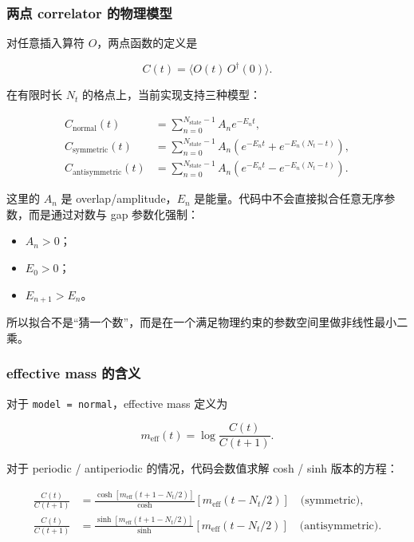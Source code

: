 \documentclass[11pt,a4paper,fontset=fandol]{ctexart}
\begin{document}
\subsubsection{两点 correlator 的物理模型}

对任意插入算符 $O$，两点函数的定义是

\begin{equation}
C(t) = \langle O(t)\, O^\dagger(0) \rangle.
\end{equation}

在有限时长 $N_t$ 的格点上，当前实现支持三种模型：

\begin{align}
C_{\mathrm{normal}}(t) &= \sum_{n=0}^{N_{\mathrm{state}}-1} A_n e^{-E_n t}, \\
C_{\mathrm{symmetric}}(t) &= \sum_{n=0}^{N_{\mathrm{state}}-1} A_n \left(e^{-E_n t} + e^{-E_n (N_t - t)}\right), \\
C_{\mathrm{antisymmetric}}(t) &= \sum_{n=0}^{N_{\mathrm{state}}-1} A_n \left(e^{-E_n t} - e^{-E_n (N_t - t)}\right).
\end{align}

这里的 $A_n$ 是 overlap/amplitude，$E_n$ 是能量。代码中不会直接拟合任意无序参数，而是通过对数与 gap 参数化强制：

\begin{itemize}[leftmargin=2em]
  \item $A_n > 0$；
  \item $E_0 > 0$；
  \item $E_{n+1} > E_n$。
\end{itemize}

所以拟合不是“猜一个数”，而是在一个满足物理约束的参数空间里做非线性最小二乘。

\subsubsection{effective mass 的含义}

对于 \lstinline|model = normal|，effective mass 定义为

\begin{equation}
m_{\mathrm{eff}}(t) = \log\frac{C(t)}{C(t+1)}.
\end{equation}

对于 periodic / antiperiodic 的情况，代码会数值求解 cosh / sinh 版本的方程：

\begin{align}
\frac{C(t)}{C(t+1)} &=
\frac{\cosh\!\left[m_{\mathrm{eff}}(t+1 - N_t/2)\right]}
\cosh\!\left[m_{\mathrm{eff}}(t - N_t/2)\right] \quad \text{(symmetric)}, \\
\frac{C(t)}{C(t+1)} &=
\frac{\sinh\!\left[m_{\mathrm{eff}}(t+1 - N_t/2)\right]}
\sinh\!\left[m_{\mathrm{eff}}(t - N_t/2)\right] \quad \text{(antisymmetric)}.
\end{align}
\end{document}
